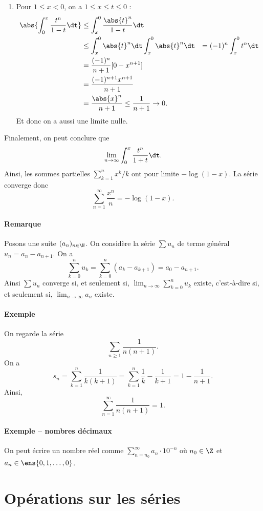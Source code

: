 \documentclass{mybourbaki}
\begin{document}
\begin{itemize}
\begin{enumerate}
\item Pour $1\leq x < 0$, on a $1\leq x \leq t \leq 0$ :
\begin{align*}
\abs{\int_{0}^{x}\frac{t^{n}}{1-t}\dt} &\leq \int_{x}^{0}\frac{\abs{t}^{n}}{1-t}\dt \\
&\leq \int_{x}^{0}\abs{t}^{n}\dt 
\int_{x}^{0}\abs{t}^{n}\dt &= (-1)^{n}\int_{x}^{0}t^{n}\dt \\
&= \frac{(-1)^{n}}{n+1}[ 0 -x^{n+1}] \\
&= \frac{(-1)^{n+1}x^{n+1}}{n+1}\\
&= \frac{\abs{x}^{n}}{n+1} \leq \frac{1}{n+1}\to 0.
\end{align*}
Et donc on a aussi une limite nulle.
\end{enumerate}
Finalement, on peut conclure que \[\lim_{n\to \infty} \int_{0}^{x}\frac{t^{n}}{1+t}\dt. \]Ainsi, les sommes partielles $\sum_{k=1}^{n}x^{k}/k$ ont pour limite $-\log(1-x)$. La série converge donc \[ \sum_{n=1}^{\infty}\frac{x^{n}}{n} = -\log(1-x).\]
\end{itemize}

\paragraph{Remarque}Posons une suite $(a_n)_{n\in \N}$. On considère la série $\sum u_n$ de terme général $u_n = a_n - a_{n+1}$. On a \[ \sum_{k=0}^{n} u_k = \sum_{k=0}^{n}(a_k - a_{k+1}) = a_0 - a_{n+1}. \]Ainsi $\sum u_n$ converge si, et seulement si, $\lim_{n\to \infty} \sum_{k=0}^{n}u_k$ existe, c'est-à-dire si, et seulement si, $\lim_{n\to \infty} a_n$ existe.

\paragraph{Exemple}On regarde la série \[\sum_{n\geq 1}\frac{1}{n(n+1)}.\]On a \[ s_n = \sum_{k=1}^{n} \frac{1}{k(k+1)} = \sum_{k=1}^{n}\frac{1}{k}-\frac{1}{k+1} = 1 - \frac{1}{n+1}.\]Ainsi, \[ \sum_{n=1}^{\infty}\frac{1}{n(n+1)} = 1.\]

\paragraph{Exemple -- nombres décimaux}On peut écrire un nombre réel comme $\sum_{n=n_0}^{\infty}a_n\cdot 10^{-n}$ où $n_0\in \Z$ et $a_n \in \ens{0,1,\ldots,0}$.

\section{Opérations sur les séries}
\end{document}
